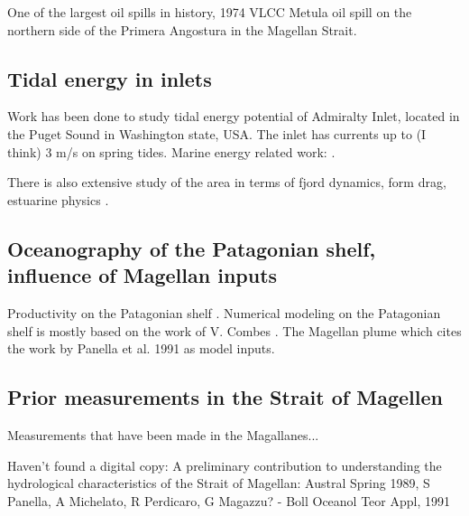 \documentclass[11pt, oneside]{article}   	%
\begin{document}
One of the largest oil spills in history, 1974 VLCC Metula oil spill on the northern side of the Primera Angostura in the Magellan Strait. 

\citep{iriarte18}

\subsection*{Tidal energy in inlets}

Work has been done to study tidal energy potential of Admiralty Inlet, located in the Puget Sound in Washington state, USA. The inlet has currents up to (I think) 3 m/s on spring tides. Marine energy related work: \citep{polagye13, kawasethyng10, thomson12, polagye09}. 

There is also extensive study of the area in terms of fjord dynamics, form drag, estuarine physics \citep[e.g.][]{warner13, geyer82}.


\subsection*{Oceanography of the Patagonian shelf, influence of Magellan inputs}
Productivity on the Patagonian shelf \citep{song16}. Numerical modeling on the Patagonian shelf is mostly based on the work of V. Combes \citep{combes14}. The Magellan plume \citep{palma12} which cites the work by Panella et al. 1991 as model inputs.

\subsection*{Prior measurements in the Strait of Magellen}
Measurements that have been made in the Magallanes... \citep{antezana99}

Haven't found a digital copy: A preliminary contribution to understanding the hydrological characteristics of the Strait of Magellan: Austral Spring 1989, S Panella, A Michelato, R Perdicaro, G Magazzu? - Boll Oceanol Teor Appl, 1991

{}

\end{document}
